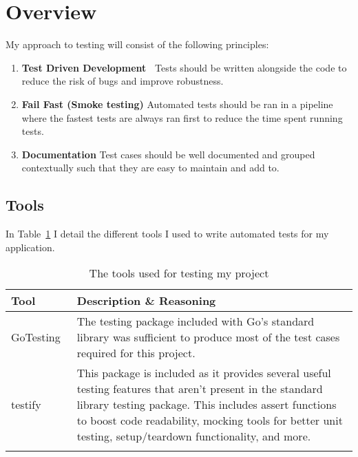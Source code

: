 \section{Overview}

My approach to testing will consist of the following principles:

\begin{enumerate}
  \item \textbf{Test Driven Development~\cite{beck_test-driven_2003}} Tests should be written alongside the code to reduce the risk of bugs and improve robustness.
  \item \textbf{Fail Fast (Smoke testing)} Automated tests should be ran in a pipeline where the fastest tests are always ran first to reduce the time spent running tests.
  \item \textbf{Documentation} Test cases should be well documented and grouped contextually such that they are easy to maintain and add to.
\end{enumerate}

\subsection*{Tools}

In Table~\ref{tab:tools-testing} I detail the different tools I used to write automated tests for my application.

\begin{longtable}{p{} p{}}
  \toprule
  \textbf{Tool} & \textbf{Description \& Reasoning}
  \\\midrule\midrule
  Go\newline Testing~\cite{noauthor_testing_nodate-1}
  & The testing package included with Go's standard library was sufficient to produce most of the test cases required for this project.
  \\
  testify~\cite{noauthor_testify_2023}
  & This package is included as it provides several useful testing features that aren't present in the standard library testing package. This includes assert functions to boost code readability, mocking tools for better unit testing, setup/teardown functionality, and more.
  \\\bottomrule\bottomrule
  \caption{The tools used for testing my project}
  \label{tab:tools-testing}
\end{longtable}
